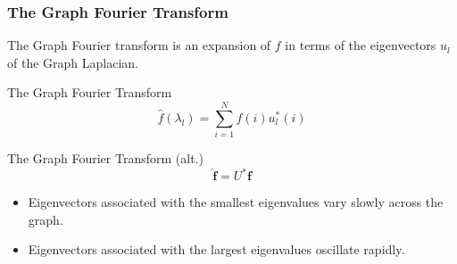 \documentclass{beamer}
\begin{document}
\begin{frame}
  \frametitle{The Graph Fourier Transform}
  The Graph Fourier transform is an expansion of $f$ in terms of the
  eigenvectors $u_l$ of the Graph Laplacian.
  
  \begin{block}{The Graph Fourier Transform}
    \begin{equation}
      \hat{f}(\lambda_l) = \sum_{i=1}^N f(i) u^*_l(i) 
    \end{equation}
  \end{block}

  \begin{block}{The Graph Fourier Transform (alt.)}
    \begin{equation}
      \hat{\mathbf{f}} = U^* \mathbf{f}
    \end{equation}
  \end{block}
  
  \begin{itemize}
    \item Eigenvectors associated with the smallest eigenvalues vary slowly across
      the graph.
    \item Eigenvectors associated with the largest eigenvalues oscillate rapidly.
  \end{itemize}
\end{frame}
\end{document}
